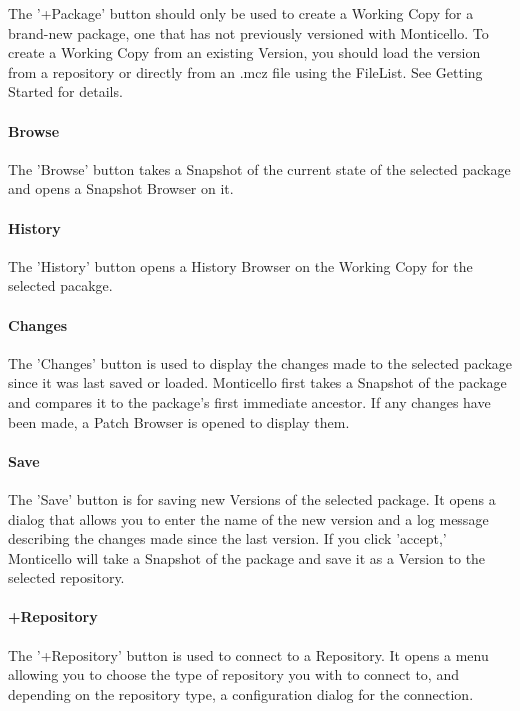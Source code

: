 \documentclass[a4paper,10pt,twoside]{book}
\begin{document}
The '+Package' button should only be used to create a Working Copy for a brand-new package, one that has not previously versioned with Monticello. To create a Working Copy from an existing Version, you should load the version from a repository or directly from an .mcz file using the FileList. See Getting Started for details.

\paragraph{Browse}

The 'Browse' button takes a Snapshot of the current state of the selected package and opens a Snapshot Browser on it.

\paragraph{History}

The 'History' button opens a History Browser on the Working Copy for the selected pacakge.

\paragraph{Changes}

The 'Changes' button is used to display the changes made to the selected package since it was last saved or loaded. Monticello first takes a Snapshot of the package and compares it to the package's first immediate ancestor. If any changes have been made, a Patch Browser is opened to display them.

\paragraph{Save}

The 'Save' button is for saving new Versions of the selected package. It opens a dialog that allows you to enter the name of the new version and a log message describing the changes made since the last version. If you click 'accept,' Monticello will take a Snapshot of the package and save it as a Version to the selected repository.

\paragraph{+Repository}

The '+Repository' button is used to connect to a Repository. It opens a menu allowing you to choose the type of repository you with to connect to, and depending on the repository type, a configuration dialog for the connection.
\end{document}

